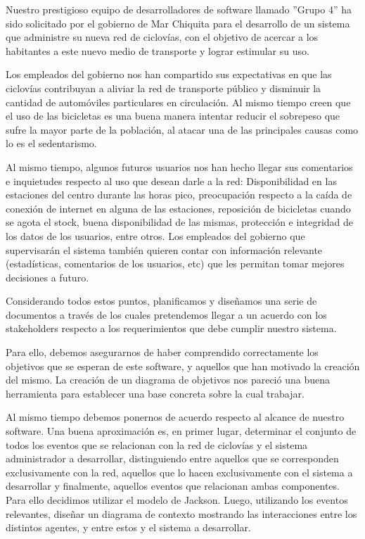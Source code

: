 Nuestro prestigioso equipo de desarrolladores de software llamado ''Grupo 4'' ha sido solicitado por el gobierno de
Mar Chiquita para el desarrollo de un sistema que administre su nueva red de ciclovías, con el objetivo de acercar
a los habitantes a este nuevo medio de transporte y lograr estimular su uso.

Los empleados del gobierno nos han compartido sus expectativas en que las ciclovías contribuyan a aliviar la 
red de transporte público y disminuir la cantidad de automóviles particulares en circulación. Al mismo tiempo
creen que el uso de las bicicletas es una buena manera intentar reducir el sobrepeso que sufre la mayor parte 
de la población, al atacar una de las principales causas como lo es el sedentarismo. 

Al mismo tiempo, algunos futuros usuarios nos han hecho llegar sus comentarios e inquietudes respecto al uso que
desean darle a la red: Disponibilidad en las estaciones del centro durante las horas pico, preocupación respecto
a la caída de conexión de internet en alguna de las estaciones, reposición de bicicletas cuando se agota el stock,
buena disponibilidad de las mismas, protección e integridad de los datos de los usuarios, entre otros. 
Los empleados del gobierno que supervisarán el sistema también quieren contar con información relevante (estadísticas,
comentarios de los usuarios, etc) que les permitan tomar mejores decisiones a futuro.

Considerando todos estos puntos, planificamos y diseñamos una serie de documentos a través de los cuales pretendemos 
llegar a un acuerdo con los stakeholders respecto a los requerimientos que debe cumplir nuestro sistema.

Para ello, debemos asegurarnos
de haber comprendido correctamente los objetivos que se esperan de este software, y aquellos que han motivado la
creación del mismo. La creación de un diagrama de objetivos nos pareció una buena herramienta para establecer
una base concreta sobre la cual trabajar.

Al mismo tiempo debemos ponernos de acuerdo respecto al alcance de nuestro software.
Una buena aproximación es, en primer lugar, determinar el conjunto de todos los eventos que se relacionan con 
la red de ciclovías y el sistema administrador a desarrollar, distinguiendo entre aquellos que se corresponden 
exclusivamente con la red, aquellos que lo hacen exclusivamente con el sistema a desarrollar y finalmente, aquellos 
eventos que relacionan ambas componentes. Para ello decidimos utilizar el modelo de Jackson.
Luego, utilizando los eventos relevantes, diseñar un diagrama de contexto mostrando
las interacciones entre los distintos agentes, y entre estos y el sistema a desarrollar.